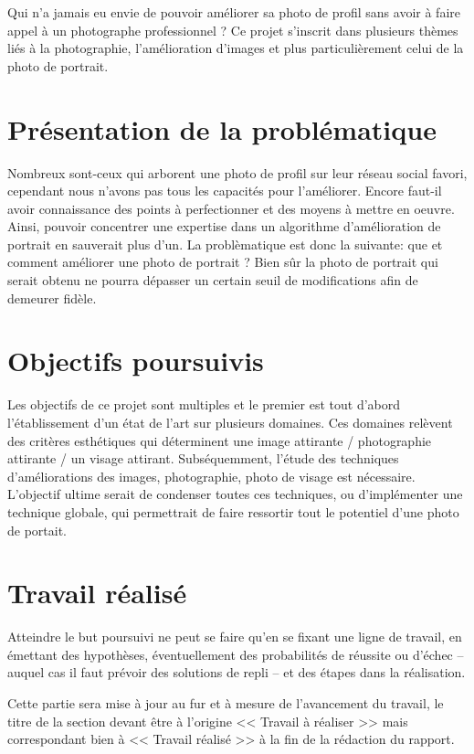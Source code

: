\documentclass[11pt, french]{report-rd-info}
\begin{document}
Qui n'a jamais eu envie de pouvoir améliorer sa photo de profil sans avoir à faire appel à un photographe professionnel ? Ce projet s'inscrit dans plusieurs thèmes liés à la photographie, l'amélioration d'images et plus particulièrement celui de la photo de portrait.

\section{Présentation de la problématique}

Nombreux sont-ceux qui arborent une photo de profil sur leur réseau social favori, cependant nous n'avons pas tous les capacités pour l'améliorer. Encore faut-il avoir connaissance des points à perfectionner et des moyens à mettre en oeuvre. 
Ainsi, pouvoir concentrer une expertise dans un algorithme d'amélioration de portrait en sauverait plus d'un. La problèmatique est donc la suivante: que et comment améliorer une photo de portrait ? Bien sûr la photo de portrait qui serait obtenu ne pourra dépasser un certain seuil de modifications afin de demeurer fidèle.

\section{Objectifs poursuivis}

Les objectifs de ce projet sont multiples et le premier est tout d'abord l'établissement d'un état de l'art sur plusieurs domaines. Ces domaines relèvent des critères esthétiques qui déterminent une image attirante / photographie attirante / un visage attirant. Subséquemment, l'étude des techniques d'améliorations des images, photographie, photo de visage est nécessaire. L'objectif ultime serait de condenser toutes ces techniques, ou d'implémenter une technique globale, qui permettrait de faire ressortir tout le potentiel d'une photo de portait. 


\section{Travail réalisé}

Atteindre le but poursuivi ne peut se faire qu'en se fixant une ligne de travail, en émettant des hypothèses, éventuellement des probabilités de réussite ou d'échec -- auquel cas il faut prévoir des solutions de repli -- et des étapes dans la réalisation.

Cette partie sera mise à jour au fur et à mesure de l'avancement du travail, le titre de la section devant être à l'origine << Travail à réaliser >> mais correspondant bien à << Travail réalisé >> à la fin de la rédaction du rapport.
\end{document}
